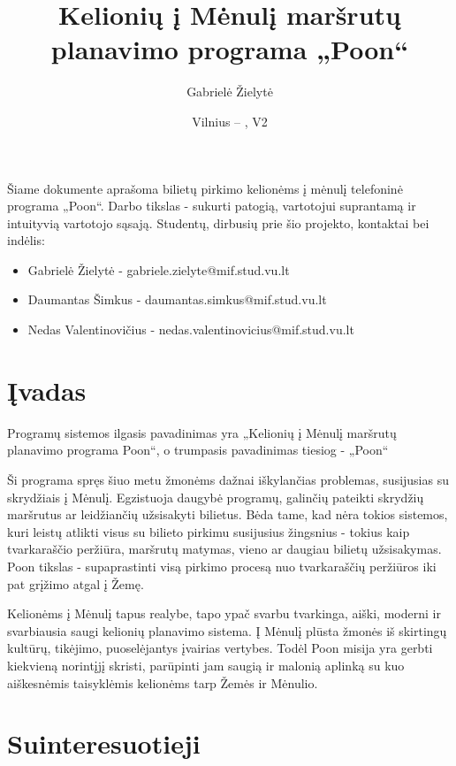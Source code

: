 \documentclass{VUMIFPSkursinis}
\title{Kelionių į Mėnulį maršrutų planavimo programa „Poon“}
\author{Gabrielė Žielytė}
\date{Vilnius – \the\year, V2}
\begin{document}
	
\maketitle

\thispagestyle{empty}
\tableofcontents


Šiame dokumente aprašoma bilietų pirkimo kelionėms į mėnulį telefoninė programa „Poon“. Darbo tikslas - sukurti patogią, vartotojui suprantamą ir intuityvią vartotojo sąsają.
Studentų, dirbusių prie šio projekto, kontaktai bei indėlis:
\begin{itemize}
\item Gabrielė Žielytė - gabriele.zielyte@mif.stud.vu.lt
\item Daumantas Šimkus - daumantas.simkus@mif.stud.vu.lt
\item Nedas Valentinovičius - nedas.valentinovicius@mif.stud.vu.lt
\end{itemize}
\thispagestyle{empty}

\cleardoublepage{}
\setcounter{page}{4}

\section{Įvadas}
Programų sistemos ilgasis pavadinimas yra „Kelionių į Mėnulį maršrutų planavimo programa Poon“, o trumpasis pavadinimas tiesiog - „Poon“

Ši programa spręs šiuo metu žmonėms dažnai iškylančias problemas, susijusias su skrydžiais į Mėnulį. Egzistuoja daugybė programų, galinčių pateikti skrydžių maršrutus ar leidžiančių užsisakyti bilietus. Bėda tame, kad nėra tokios sistemos, kuri leistų atlikti visus su bilieto pirkimu susijusius žingsnius - tokius kaip tvarkaraščio peržiūra, maršrutų matymas, vieno ar daugiau bilietų užsisakymas. Poon tikslas - supaprastinti visą pirkimo procesą nuo tvarkaraščių peržiūros iki pat grįžimo atgal į Žemę.

Kelionėms į Mėnulį tapus realybe, tapo ypač svarbu tvarkinga, aiški, moderni ir svarbiausia saugi kelionių planavimo sistema. Į Mėnulį plūsta žmonės iš skirtingų kultūrų, tikėjimo, puoselėjantys įvairias vertybes. Todėl Poon misija yra gerbti kiekvieną norintįjį skristi, parūpinti jam saugią ir malonią aplinką su kuo aiškesnėmis taisyklėmis kelionėms tarp Žemės ir Mėnulio.



\section{Suinteresuotieji}
\end{document}

